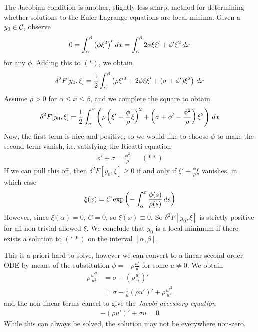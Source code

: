 \documentclass{../../template/note}
\begin{document}
    The Jacobian condition is another, slightly less sharp, method for determining whether solutions to the Euler-Lagrange equations are local minima. Given a $y_0 \in \mathcal{C}$, observe
    \begin{align*}
        0 = \int_\alpha^\beta \left(\phi \xi^2\right)' \,d{x} = \int_\alpha^\beta 2\phi \xi \xi' + \phi' \xi^2 \,d{x}
    \end{align*}
    for any $\phi$. Adding this to $(*)$, we obtain
    \begin{align*}
        \delta^2 F[y_0, \xi] = \frac 1 2 \int_\alpha^\beta \left(\rho \xi'^2 + 2\phi \xi \xi' + (\sigma+\phi')\xi^2\right) \,d{x}
    \end{align*}
    Assume $\rho > 0$ for $\alpha \leq x \leq \beta$, and we complete the square to obtain
    \begin{align*}
        \delta^2 F[y_0, \xi] = \frac 1 2 \int_\alpha^\beta \left(\rho \left(\xi' + \frac \phi \rho \xi\right)^2 + \left(\sigma + \phi' - \frac{\phi^2}{\rho}\right)\xi^2 \right) \,d{x}
    \end{align*}
    Now, the first term is nice and positive, so we would like to choose $\phi$ to make the second term vanish, i.e. satisfying the Ricatti equation
    \begin{align*}
        \phi' + \sigma = \frac{\phi^2}{\rho} && (**)
    \end{align*}
    If we can pull this off, then $\delta^2 F[y_0, \xi] \geq 0$ if and only if $\xi' + \frac \phi \rho \xi$ vanishes, in which case
    \begin{align*}
        \xi(x) = C \exp\left(-\int_\alpha^x \frac{\phi(s)}{\rho(s)} \,d{s}\right)
    \end{align*}
    However, since $\xi(\alpha) = 0$, $C=0$, so $\xi(x) \equiv 0$. So $\delta^2F[y_0, \xi]$ is strictly positive for all non-trivial allowed $\xi$. We conclude that $y_0$ is a local minimum if there exists a solution to $(**)$ on the interval $[\alpha, \beta]$.  
    
    This is a priori hard to solve, however we can convert to a linear second order ODE by means of the substitution $\phi = -\rho \frac{u'}{u}$ for some $u \neq 0$. We obtain
    \begin{align*}
        \rho \frac {u'^2} {u^2} &= \sigma - \left(\rho \frac{u'} u\right)' \\
        &= \sigma - \frac 1 u (\rho u')' + \rho \frac{u'^2}{u^2}
    \end{align*}
    and the non-linear terms cancel to give the \emph{Jacobi accessory equation}
    \begin{align*}
        -(\rho u')' + \sigma u = 0
    \end{align*}
    While this can always be solved, the solution may not be everywhere non-zero.
\end{document}
